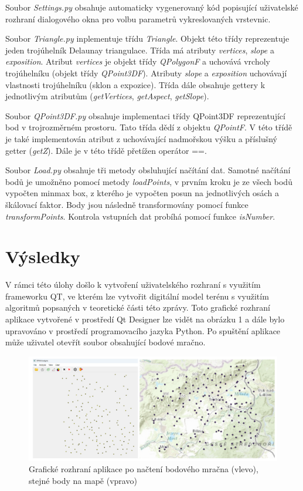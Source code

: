 \documentclass{article}
\begin{document}
\begin{spacing}{1.5}
Soubor \textit{Settings.py} obsahuje automaticky vygenerovaný kód popisující uživatelské rozhraní dialogového okna pro volbu parametrů vykreslovaných vrstevnic. 

Soubor \textit{Triangle.py} inplementuje třídu \textit{Triangle}. Objekt této třídy reprezentuje jeden trojúhelník Delaunay triangulace. Třída má atributy \textit{vertices}, \textit{slope} a \textit{exposition}. Atribut \textit{vertices} je objekt třídy \textit{QPolygonF} a uchovává vrcholy trojúhelníku (objekt třídy \textit{QPoint3DF}). Atributy \textit{slope} a \textit{exposition} uchovávají vlastnosti trojúhelníku (sklon a expozice). Třída dále obsahuje gettery k jednotlivým atributům (\textit{getVertices}, \textit{getAspect}, \textit{getSlope}).

Soubor \textit{QPoint3DF.py} obsahuje implementaci třídy QPoint3DF reprezentující bod v trojrozměrném prostoru. Tato třída dědí z objektu \textit{QPointF}. V této třídě je také implementován atribut z uchovávající nadmořskou výšku a příslušný getter (\textit{getZ}). Dále je v této třídě přetížen operátor ==.

Soubor \textit{Load.py} obsahuje tři metody obsluhující načítání dat. Samotné načítání bodů je umožněno pomocí metody \textit{loadPoints}, v prvním kroku je ze všech bodů vypočten minmax box, z kterého je vypočten posun na jednotlivých osách a škálovací faktor. Body jsou následně transformovány pomocí funkce \textit{transformPoints}. Kontrola vstupních dat probíhá pomocí funkce \textit{isNumber}.

\newpage
\section{Výsledky}
V rámci této úlohy došlo k vytvoření uživatelského rozhraní s využitím frameworku QT, ve kterém lze vytvořit digitální model terénu s využitím algoritmů popsaných v teoretické části této zprávy. Toto grafické rozhraní aplikace vytvořené v prostředí Qt Designer lze vidět na obrázku 1 a dále bylo upravováno v prostředí programovacího jazyka Python. Po spuštění aplikace může uživatel otevřít soubor obsahující bodové mračno.

\begin{figure}[h]
    \centering
    \includegraphics[width=0.9\linewidth]{images/01rozhrani.png}
    \caption{Grafické rozhraní aplikace po načtení bodového mračna (vlevo), stejné body na mapě (vpravo)}
    \label{fig:enter-label}
\end{figure}


\end{spacing}
\end{document}
